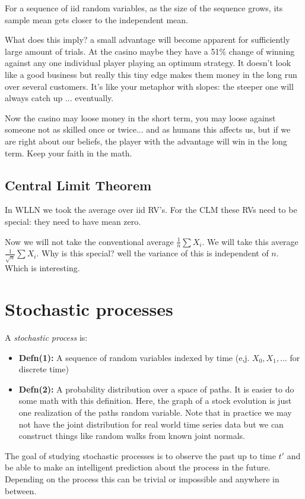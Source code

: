 \documentclass{article}
\begin{document}
For a sequence of iid random variables, as the size of the sequence grows, its sample mean gets closer to the independent mean. 

What does this imply? a small advantage will become apparent for sufficiently large amount of trials. At the casino maybe they have a 51\% change of winning against any one individual player playing an optimum strategy. It doesn't look like a good business but really this tiny edge makes them money in the long run over several customers. It's like your metaphor with slopes: the steeper one will always catch up ... eventually. 

Now the casino may loose money in the short term, you may loose against someone not as skilled once or twice... and as humans this affects us, but if we are right about our beliefs, the player with the advantage will win in the long term. Keep your faith in the math. 


\subsection{Central Limit Theorem}
In WLLN we took the average over iid RV's. For the CLM these RVs need to be special: they need to have mean zero. 

Now we will not take the conventional average $\frac{1}{n} \sum X_i$. We will take this average $\frac{1}{\sqrt{n}} \sum X_i$. Why is this special? well the variance of this is independent of $n$. Which is interesting. 
\section{Stochastic processes}
A \textit{stochastic process} is:
\begin{itemize}
\item \textbf{Defn(1):} A sequence of random variables indexed by time (e,j. $X_0, X_1, \dots$ for discrete time)
\item \textbf{Defn(2):} A probability distribution over a space of paths. It is easier to do some math with this definition. Here, the graph of a stock evolution is just one realization of the paths random variable. Note that in practice we may not have the joint distribution for real world time series data but we can construct things like random walks from known joint normals. 
\end{itemize}

The goal of studying stochastic processes is to observe the past up to time $t'$ and be able to make an intelligent prediction about the process in the future. Depending on the process this can be trivial or impossible and anywhere in between. 
\end{document}
